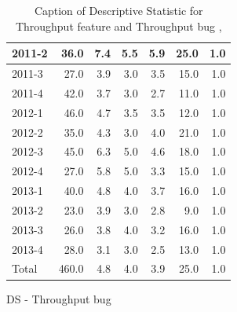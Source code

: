 \documentclass[UKenglish]{ifimaster}  %
\begin{document}
\begin{appendices}
\begin{table}[!htbp]
\begin{adjustwidth}{-2.5cm}{}
\begin{subfigure}[b]{0.3\textwidth}
{\begin{tabular}{ | l | r | r | r | r | r | r | }
2011-2 & 36.0 & 7.4 & 5.5 & 5.9 & 25.0 & 1.0\\ \hline
2011-3 & 27.0 & 3.9 & 3.0 & 3.5 & 15.0 & 1.0\\ \hline
2011-4 & 42.0 & 3.7 & 3.0 & 2.7 & 11.0 & 1.0\\ \hline
2012-1 & 46.0 & 4.7 & 3.5 & 3.5 & 12.0 & 1.0\\ \hline
2012-2 & 35.0 & 4.3 & 3.0 & 4.0 & 21.0 & 1.0\\ \hline
2012-3 & 45.0 & 6.3 & 5.0 & 4.6 & 18.0 & 1.0\\ \hline
2012-4 & 27.0 & 5.8 & 5.0 & 3.3 & 15.0 & 1.0\\ \hline
2013-1 & 40.0 & 4.8 & 4.0 & 3.7 & 16.0 & 1.0\\ \hline
2013-2 & 23.0 & 3.9 & 3.0 & 2.8 & 9.0 & 1.0\\ \hline
2013-3 & 26.0 & 3.8 & 4.0 & 3.2 & 16.0 & 1.0\\ \hline
2013-4 & 28.0 & 3.1 & 3.0 & 2.5 & 13.0 & 1.0\\ \hline
Total & 460.0 & 4.8 & 4.0 & 3.9 & 25.0 & 1.0\\ \hline
\end{tabular}
}
\caption{DS - Throughput bug}
 \label{DS:TPB:2}
\end{subfigure}
\end{adjustwidth}
\caption[Optional caption for list of figures]{Caption of Descriptive Statistic for Throughput feature and Throughput bug  , }
\label{DS:2:2}
\end{table}





\end{appendices}
\end{document}
